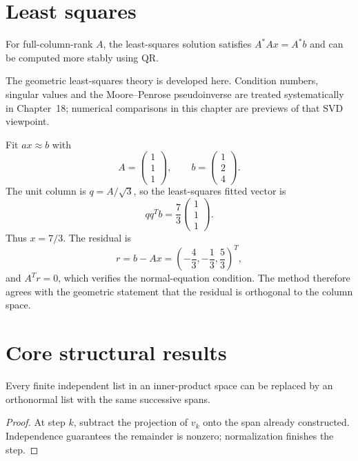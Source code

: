 \section{Least squares}
For full-column-rank $A$, the least-squares solution satisfies $A^*Ax=A^*b$ and can be computed more stably using QR.


\begin{remark}
The geometric least-squares theory is developed here. Condition numbers,
singular values and the Moore--Penrose pseudoinverse are treated systematically
in Chapter~18; numerical comparisons in this chapter are previews of that SVD
viewpoint.
\end{remark}

\begin{example}\label{ex:i14-expand-03}
Fit \(ax\approx b\) with
\[
A=\begin{pmatrix}1\\1\\1\end{pmatrix},\qquad
b=\begin{pmatrix}1\\2\\4\end{pmatrix}.
\]
The unit column is \(q=A/\sqrt3\), so the least-squares fitted vector is
\[
qq^Tb=\frac{7}{3}\begin{pmatrix}1\\1\\1\end{pmatrix}.
\]
Thus \(x=7/3\). The residual is
\[
r=b-Ax=\left(-\frac43,-\frac13,\frac53\right)^T,
\]
and \(A^Tr=0\), which verifies the normal-equation condition. The method
therefore agrees with the geometric statement that the residual is orthogonal
to the column space.
\end{example}
\section{Core structural results}

\begin{theorem}\label{thm:i14-01}
Every finite independent list in an inner-product space can be replaced by an orthonormal list with the same successive spans.
\begin{proof}
At step $k$, subtract the projection of $v_k$ onto the span already constructed. Independence guarantees the remainder is nonzero; normalization finishes the step.
\end{proof}
\end{theorem}

